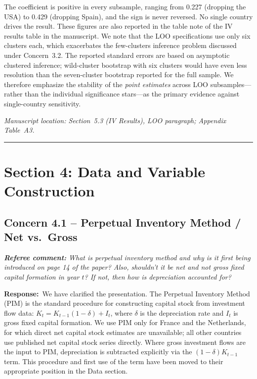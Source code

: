 \documentclass[11pt]{article}
\newcommand{\RC}[1]{\begin{refereebox}\textit{\textbf{Referee comment:} #1}\end{refereebox}}
\newcommand{\AR}{\noindent\textbf{Response:}\ }
\begin{document}
The coefficient is positive in every subsample, ranging from 0.227 (dropping the USA) to 0.429 (dropping Spain), and the sign is never reversed. No single country drives the result. These figures are also reported in the table note of the IV results table in the manuscript. We note that the LOO specifications use only six clusters each, which exacerbates the few-clusters inference problem discussed under Concern~3.2. The reported standard errors are based on asymptotic clustered inference; wild-cluster bootstrap with six clusters would have even less resolution than the seven-cluster bootstrap reported for the full sample. We therefore emphasize the stability of the \emph{point estimates} across LOO subsamples---rather than the individual significance stars---as the primary evidence against single-country sensitivity.

\smallskip\noindent\textit{Manuscript location: Section~5.3 (IV Results), LOO paragraph; Appendix Table~A3.}

\bigskip\noindent\rule{\textwidth}{0.4pt}\bigskip

\section*{Section 4: Data and Variable Construction}

\subsection*{Concern 4.1 -- Perpetual Inventory Method / Net vs.\ Gross}

\RC{What is perpetual inventory method and why is it first being introduced on page 14 of the paper? Also, shouldn't it be net and not gross fixed capital formation in year $t$? If not, then how is depreciation accounted for?}

\AR We have clarified the presentation. The Perpetual Inventory Method (PIM) is the standard procedure for constructing capital stock from investment flow data: $K_t = K_{t-1}(1 - \delta) + I_t$, where $\delta$ is the depreciation rate and $I_t$ is gross fixed capital formation. We use PIM only for France and the Netherlands, for which direct net capital stock estimates are unavailable; all other countries use published net capital stock series directly. Where gross investment flows are the input to PIM, depreciation is subtracted explicitly via the $(1-\delta)K_{t-1}$ term. This procedure and first use of the term have been moved to their appropriate position in the Data section.
\end{document}
